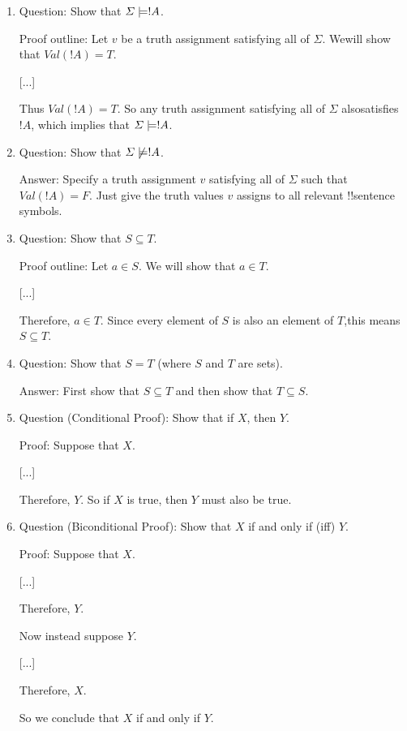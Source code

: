 \documentclass[../../include/open-logic-section]{subfiles}
\begin{document}

\begin{enumerate}

\item Question: Show that $\Sigma \Entails !A$.

Proof outline: Let $v$ be a truth assignment satisfying all of $\Sigma$. Wewill show that $Val(!A) = T$.

    [...]

Thus $Val(!A) = T$. So any truth assignment satisfying all of $\Sigma$ alsosatisfies $!A$, which implies that $\Sigma \Entails !A$.

\item Question: Show that $\Sigma \Entails/ !A$.

Answer: Specify a truth assignment $v$ satisfying all of $\Sigma$ such that$Val(!A) = F$. Just give the truth values $v$ assigns to all relevant
!!{sentence} symbols.

\item Question: Show that $S \subseteq T$.

Proof outline: Let $a \in S$. We will show that $a \in T$.

[...]

Therefore, $a \in T$. Since every element of $S$ is also an element of $T$,this means $S \subseteq T$.

\item Question: Show that $S = T$ (where $S$ and $T$ are sets).

Answer: First show that $S \subseteq T$ and then show that $T \subseteq S$.
\item Question (Conditional Proof): Show that if $X$, then $Y$.

Proof: Suppose that $X$.

[...]

Therefore, $Y$. So if $X$ is true, then $Y$ must also be true.

\item Question (Biconditional Proof): Show that $X$ if and only if (iff)
$Y$.

Proof: Suppose that $X$.

[...]

Therefore, $Y$.

Now instead suppose $Y$.

[...]

Therefore, $X$.

So we conclude that $X$ if and only if $Y$.


\end{enumerate}
\end{document}
